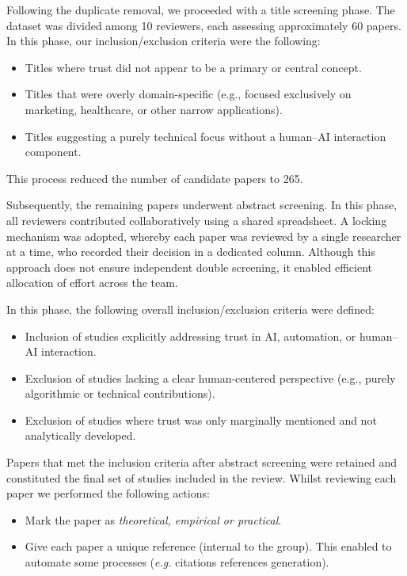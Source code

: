 \documentclass[sigconf]{acmart}
\begin{document}
Following the duplicate removal, we proceeded with a title screening phase. The dataset was divided among 10 reviewers, each assessing approximately 60 papers. In this phase, our inclusion/exclusion criteria were the following:

\begin{itemize}
    \item Titles where trust did not appear to be a primary or central concept.
    \item Titles that were overly domain-specific (e.g., focused exclusively on marketing, healthcare, or other narrow applications).
    \item Titles suggesting a purely technical focus without a human--AI interaction component.
\end{itemize}


This process reduced the number of candidate papers to 265.

Subsequently, the remaining papers underwent abstract screening. In this phase, all reviewers contributed collaboratively using a shared spreadsheet. A locking mechanism was adopted, whereby each paper was reviewed by a single researcher at a time, who recorded their decision in a dedicated column. Although this approach does not ensure independent double screening, it enabled efficient allocation of effort across the team.

In this phase, the following overall inclusion/exclusion criteria were defined:
\begin{itemize}
    \item Inclusion of studies explicitly addressing trust in AI, automation, or human--AI interaction.
    \item Exclusion of studies lacking a clear human-centered perspective (e.g., purely algorithmic or technical contributions).
    \item Exclusion of studies where trust was only marginally mentioned and not analytically developed.
\end{itemize}

Papers that met the inclusion criteria after abstract screening were retained and constituted the final set of studies included in the review. Whilst reviewing each paper we performed the following actions:

\begin{itemize}
\item Mark the paper as \emph{theoretical, empirical or practical}.
\item Give each paper a unique reference (internal to the group). This enabled to automate some processes (\emph{e.g.} citations references generation). 
\end{itemize}
\end{document}
